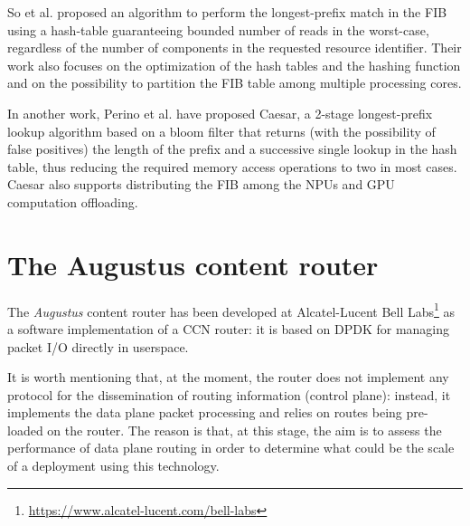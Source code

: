 \documentclass[12pt,a4paper,twoside]{book}
\begin{document}
So et al.\cite{ndn_fast_dosresistant} proposed an algorithm to perform the longest-prefix match in the \gls{FIB} using a hash-table guaranteeing bounded number of reads in the worst-case, regardless of the number of components in the requested resource identifier. Their work also focuses on the optimization of the hash tables and the hashing function and on the possibility to partition the \gls{FIB} table among multiple processing cores.

In another work, Perino et al.\cite{caesar} have proposed Caesar, a 2-stage longest-prefix lookup algorithm based on a bloom filter that returns (with the possibility of false positives) the length of the prefix and a successive single lookup in the hash table, thus reducing the required memory access operations to two in most cases. Caesar also supports distributing the \gls{FIB} among the NPUs and GPU computation offloading.




\chapter{The Augustus content router}
\label{chap:augustus}

The \textit{Augustus} content router has been developed at Alcatel-Lucent Bell Labs\footnote{\url{https://www.alcatel-lucent.com/bell-labs}} as a software implementation of a \gls{CCN} router:
it is based on DPDK \cite{dpdk} for managing packet I/O directly in userspace.

It is worth mentioning that, at the moment, the router does not implement any protocol for the dissemination of routing information (control plane): instead, it implements the data plane packet processing and relies on routes being pre-loaded on the router. The reason is that, at this stage, the aim is to assess the performance of data plane routing in order to determine what could be the scale of a deployment using this technology.
\end{document}
